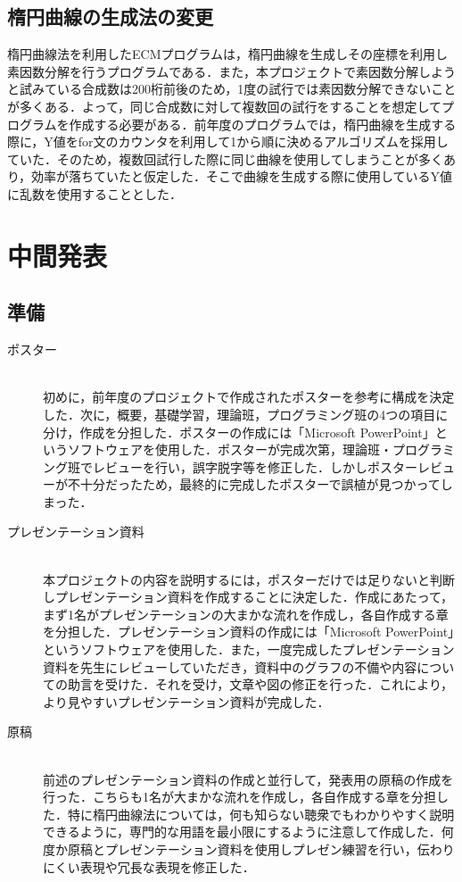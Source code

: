 \documentclass[openany,11pt,papersize]{jsbook}
\begin{document}
\subsection{楕円曲線の生成法の変更}\label{sec:alg3}
楕円曲線法を利用したECMプログラムは，楕円曲線を生成しその座標を利用し素因数分解を行うプログラムである．また，本プロジェクトで素因数分解しようと試みている合成数は200桁前後のため，1度の試行では素因数分解できないことが多くある．よって，同じ合成数に対して複数回の試行をすることを想定してプログラムを作成する必要がある．前年度のプログラムでは，楕円曲線を生成する際に，Y値をfor文のカウンタを利用して1から順に決めるアルゴリズムを採用していた．そのため，複数回試行した際に同じ曲線を使用してしまうことが多くあり，効率が落ちていたと仮定した．そこで曲線を生成する際に使用しているY値に乱数を使用することとした．


\section{中間発表}

\subsection{準備}
\begin{description}
\item[ポスター]\mbox{}\\
初めに，前年度のプロジェクトで作成されたポスターを参考に構成を決定した．次に，概要，基礎学習，理論班，プログラミング班の4つの項目に分け，作成を分担した．ポスターの作成には「Microsoft PowerPoint」というソフトウェアを使用した．ポスターが完成次第，理論班・プログラミング班でレビューを行い，誤字脱字等を修正した．しかしポスターレビューが不十分だったため，最終的に完成したポスターで誤植が見つかってしまった．


\item[プレゼンテーション資料]\mbox{}\\
本プロジェクトの内容を説明するには，ポスターだけでは足りないと判断しプレゼンテーション資料を作成することに決定した．作成にあたって，まず1名がプレゼンテーションの大まかな流れを作成し，各自作成する章を分担した．プレゼンテーション資料の作成には「Microsoft PowerPoint」というソフトウェアを使用した．また，一度完成したプレゼンテーション資料を先生にレビューしていただき，資料中のグラフの不備や内容についての助言を受けた．それを受け，文章や図の修正を行った．これにより，より見やすいプレゼンテーション資料が完成した．


\item[原稿]\mbox{}\\
前述のプレゼンテーション資料の作成と並行して，発表用の原稿の作成を行った．こちらも1名が大まかな流れを作成し，各自作成する章を分担した．特に楕円曲線法については，何も知らない聴衆でもわかりやすく説明できるように，専門的な用語を最小限にするように注意して作成した．何度か原稿とプレゼンテーション資料を使用しプレゼン練習を行い，伝わりにくい表現や冗長な表現を修正した．
\end{description}
\end{document}
